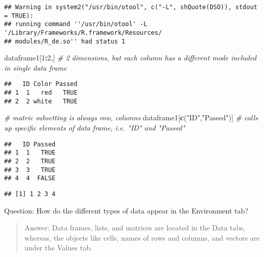 \documentclass[]{article}
\newenvironment{Shaded}{\begin{snugshade}}{\end{snugshade}}
\newcommand{\KeywordTok}[1]{\textcolor[rgb]{0.13,0.29,0.53}{\textbf{#1}}}
\newcommand{\DecValTok}[1]{\textcolor[rgb]{0.00,0.00,0.81}{#1}}
\newcommand{\StringTok}[1]{\textcolor[rgb]{0.31,0.60,0.02}{#1}}
\newcommand{\CommentTok}[1]{\textcolor[rgb]{0.56,0.35,0.01}{\textit{#1}}}
\newcommand{\OperatorTok}[1]{\textcolor[rgb]{0.81,0.36,0.00}{\textbf{#1}}}
\newcommand{\NormalTok}[1]{#1}
\begin{document}
\begin{verbatim}
## Warning in system2("/usr/bin/otool", c("-L", shQuote(DSO)), stdout = TRUE):
## running command ''/usr/bin/otool' -L '/Library/Frameworks/R.framework/Resources/
## modules/R_de.so'' had status 1
\end{verbatim}

\begin{Shaded}
\begin{Highlighting}[]
\NormalTok{dataframe1[}\DecValTok{1}\OperatorTok{:}\DecValTok{2}\NormalTok{,] }\CommentTok{# 2 dimensions, but each column has a different mode included in single data frame}
\end{Highlighting}
\end{Shaded}

\begin{verbatim}
##   ID Color Passed
## 1  1   red   TRUE
## 2  2 white   TRUE
\end{verbatim}

\begin{Shaded}
\begin{Highlighting}[]
\CommentTok{# matric subsetting is always row, columns}
\NormalTok{dataframe1[}\KeywordTok{c}\NormalTok{(}\StringTok{"ID"}\NormalTok{,}\StringTok{"Passed"}\NormalTok{)] }\CommentTok{# calls up specific elements of data frame, i.e. "ID" and "Passed"}
\end{Highlighting}
\end{Shaded}

\begin{verbatim}
##   ID Passed
## 1  1   TRUE
## 2  2   TRUE
## 3  3   TRUE
## 4  4  FALSE
\end{verbatim}

\begin{Shaded}
\end{Shaded}

\begin{verbatim}
## [1] 1 2 3 4
\end{verbatim}

Question: How do the different types of data appear in the Environment
tab?

\begin{quote}
Answer: Data frames, lists, and matrices are located in the Data tabs,
whereas, the objects like cells, names of rows and columns, and vectors
are under the Values tab.
\end{quote}
\end{document}
